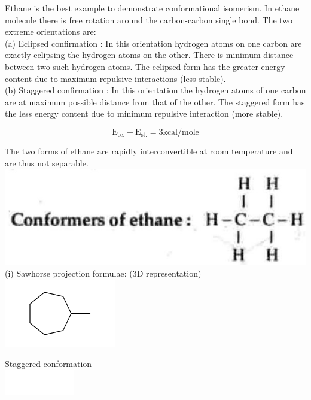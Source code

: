 \documentclass[10pt]{article}
\begin{document}
Ethane is the best example to demonstrate conformational isomerism. In ethane molecule there is free rotation around the carbon-carbon single bond. The two extreme orientations are:\\
(a) Eclipsed confirmation : In this orientation hydrogen atoms on one carbon are exactly eclipsing the hydrogen atoms on the other. There is minimum distance between two such hydrogen atoms. The eclipsed form has the greater energy content due to maximum repulsive interactions (less stable).\\
(b) Staggered confirmation : In this orientation the hydrogen atoms of one carbon are at maximum possible distance from that of the other. The staggered form has the less energy content due to minimum repulsive interaction (more stable).

$$
\mathrm{E}_{\mathrm{ec} .}-\mathrm{E}_{\mathrm{st} .}=3 \mathrm{kcal} / \mathrm{mole}
$$

The two forms of ethane are rapidly interconvertible at room temperature and are thus not separable.\\
\includegraphics[max width=\textwidth, center]{2025_01_28_8470952b98110cec3aabg-059(1)}\\
(i) Sawhorse projection formulae: (3D representation)\\
\includegraphics{smile-568ba641779a15ed23e3a661b2dc5d89950044a5}

Staggered conformation\\
\includegraphics{smile-f5e17a8c2251c78349555a3d780af42e603873a2}
\end{document}
